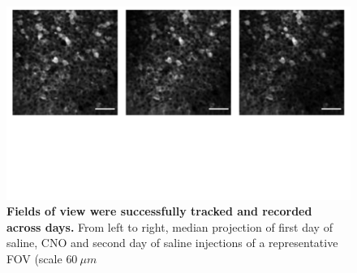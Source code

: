 \begin{figure}[h]
    \centering
    \includegraphics[trim={0 240 0 0},clip,width=\textwidth]{Figures/Chapter4/example_longitudinal_FOV.pdf}
    \caption[Fields of view were successfully tracked and recorded across days]{\textbf{Fields of view were successfully tracked and recorded across days.} 
    From left to right, median projection of first day of saline, CNO and second day of saline injections of a representative FOV (scale $60\ \mu m$}
    \label{fig:chap4:example_longitudinal_FOV}
\end{figure}

